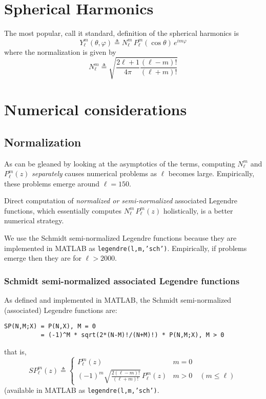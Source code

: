 \documentclass[a4paper,10pt]{article}
\newcommand{\dfn}{\triangleq}
\begin{document}
\section{Spherical Harmonics}

The most popular, call it standard, definition of the spherical harmonics is
\[
	Y_{\ell}^{m}(\theta,\varphi)\dfn
		N_{\ell}^{m}\,
		P_{\ell}^{m}(\cos\theta)\,
		e^{i m\varphi}
\]
where the normalization is given by
\[
	N_{\ell}^{m}\dfn\sqrt{\frac{2\ell+1}{4\pi}\frac{(\ell-m)!}{(\ell+m)!}}
\]

\section{Numerical considerations}

\subsection{Normalization}

As can be gleaned by looking at the asymptotics of the terms, computing $N_{\ell}^{m}$ and $P_{\ell}^{m}(z)$ \emph{separately} causes numerical problems as $\ell$ becomes large. Empirically, these problems emerge around $\ell=150$.

Direct computation of \emph{normalized or semi-normalized} associated Legendre functions, which essentially computes $N_{\ell}^{m}\,P_{\ell}^{m}(z)$ holistically, is a better numerical strategy.

We use the Schmidt semi-normalized Legendre functions because they are implemented in MATLAB as {\tt\color{blue}legendre(l,m,'sch')}. Empirically, if problems emerge then they are for $\ell>2000$.

\subsubsection{Schmidt semi-normalized associated Legendre functions}

As defined and implemented in MATLAB, the Schmidt semi-normalized (associated) Legendre functions are:
\color{blue}\begin{verbatim}
SP(N,M;X) = P(N,X), M = 0
          = (-1)^M * sqrt(2*(N-M)!/(N+M)!) * P(N,M;X), M > 0
\end{verbatim}\color{black}
that is,
\[
	S\!P_{\ell}^{m}(z)\dfn
		\begin{cases}
			\displaystyle
			P_{\ell}^{m}(z) &m=0 \\
			\displaystyle
			(-1)^{m}\sqrt{\frac{2(\ell-m)!}{(\ell+m)!}}\,
			P_{\ell}^{m}(z) &m>0\quad (m\leq\ell)
		\end{cases}
\]
(available in MATLAB as {\tt\color{blue}legendre(l,m,'sch')}.
\end{document}
